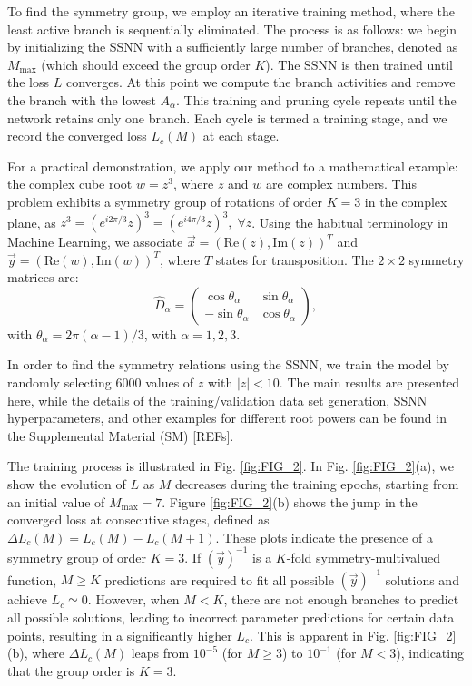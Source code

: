To find the symmetry group, we employ an iterative training method, where the least active branch is sequentially eliminated. The process is as follows: we begin by initializing the SSNN with a sufficiently large number of branches, denoted as $M_{\mathrm{max}}$ (which should exceed the group order $K$). The SSNN is then trained until the loss $L$ converges. At this point we compute the branch activities and remove the branch with the lowest $A_{\alpha}$.  This training and pruning cycle repeats until the network retains only one branch. Each cycle is termed a training stage, and we record the converged loss $L_c (M)$ at each stage. 

For a practical demonstration, we apply our method to a mathematical example: the complex cube root $w=z^3$, where $z$ and $w$ are complex numbers.  This problem exhibits a symmetry group of rotations of order $K=3$ in the complex plane, as $z^3 = (e^{i2\pi / 3} z)^3 = (e^{i4\pi / 3} z)^3 , \; \forall z$.  Using the habitual terminology in Machine Learning, we associate $\vec{x} = (\mathrm{Re}(z),\mathrm{Im}(z))^T$ and $\vec{y} = (\mathrm{Re}(w),\mathrm{Im}(w))^T$, where $T$ states for transposition. The $2 \times 2$ symmetry matrices are:
%
\begin{equation}\label{eq:dalpha}
    \hat{D}_{\alpha} = \begin{pmatrix}
                        \cos{\theta_{\alpha}} & \sin{\theta_{\alpha}} \\
                        -\sin{\theta_{\alpha}} & \cos{\theta_{\alpha}}
                        \end{pmatrix},
\end{equation}
%
with $\theta_{\alpha} = 2\pi (\alpha-1)/3 $, with $\alpha = 1,2,3$. 

In order to find the symmetry relations using the SSNN, we train the model by randomly selecting 6000 values of $z$ with $|z|<10$. The main results are presented here, while the details of the training/validation data set generation, SSNN hyperparameters, and other examples for different root powers can be found in the Supplemental Material (SM) [REFs].

The training process is illustrated in Fig. \ref{fig:FIG_2}. In Fig. \ref{fig:FIG_2}(a), we show the evolution of $L$ as $M$ decreases during the training epochs, starting from an initial value of $M_{\mathrm{max}} = 7$.  Figure \ref{fig:FIG_2}(b) shows the jump in the converged loss at consecutive stages, defined as $\Delta L_c (M) = L_c (M) - L_c (M+1)$. These plots indicate the presence of a symmetry group of order $K = 3$.  If $(\vec{y})^{-1}$ is a $K$-fold symmetry-multivalued function, $M \geq K$ predictions are required to fit all possible $(\vec{y})^{-1}$ solutions and achieve $L_c \simeq 0$.  However, when $M < K$, there are not enough branches to predict all possible solutions, leading to incorrect parameter predictions for certain data points, resulting in a significantly higher $L_c$.  This is apparent in Fig. \ref{fig:FIG_2}(b), where $\Delta L_c(M)$ leaps from $10^{-5}$ (for $M \geq 3$) to $10^{-1}$ (for $M < 3$), indicating that the group order is $K=3$.

